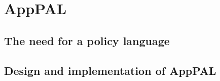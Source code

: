 \documentclass[thesis.tex]{subfiles}
\begin{document}
\chapter{AppPAL}

\section{The need for a policy language}

\section{Design and implementation of AppPAL}
\end{document}
